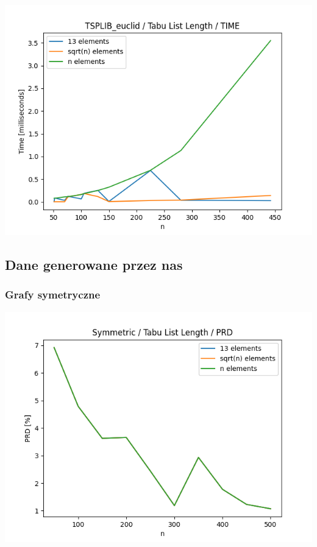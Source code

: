 \documentclass{article}
\begin{document}
\begin{center}
\includegraphics[width=\textwidth, 
                   height = 0.4\textheight, 
                   keepaspectratio]
                  {plots/tabu_tsplib_euclid_time} 
\end{center}


\subsection{Dane generowane przez nas}


\subsubsection{Grafy symetryczne}

\begin{center}
\includegraphics[width=\textwidth, 
                   height = 0.4\textheight, 
                   keepaspectratio]
                  {plots/tabu_symmetric_prd} 
\end{center}
\end{document}

